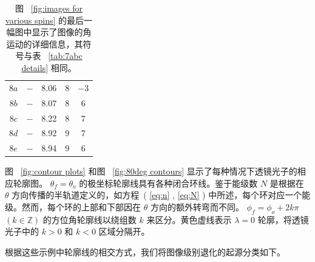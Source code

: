 \documentclass[aps,reprint,superscriptaddress,nofootinbib,floatfix,longbibliography,preprintnumbers]{revtex4-1}
\begin{document}
\begin{table}[!htbp]
\begin{tabular}{ccccc}
        $8a$         &         $-$         & 8.06 & 8 &         $-3$          \\ 
        $8b$         &         $-$         & 8.07 & 8 &         $6$          \\ 
        $8c$         &         $-$         & 8.22 & 8 &         $7$          \\ 
        $8d$         &         $-$         & 8.92 & 9 &         $7$          \\ 
        $8e$         &         $-$         & 8.94 & 9 &         $6$          \\  \hline
\end{tabular}
\caption{图~    \ref{fig:images for various spins}    的最后一幅图中显示了图像的角运动的详细信息，其符号与表~    \ref{tab:7abc details}    相同。  }
\label{tab:80deg details}
\end{table}     

图~    \ref{fig:contour plots}    和图~    \ref{fig:80deg contours}    显示了每种情况下透镜光子的相应轮廓图。   $\theta_f = \theta_o$    的极坐标轮廓线具有各种闭合环线。鉴于能级数    $N$    是根据在    $\theta$    方向传播的半轨道定义的，如方程~(    \ref{eq:n}    ,    \ref{eq:N}    ) 中所述，每个环对应一个能级。然而，每个环的上部和下部因在    $\theta$    方向的额外转弯而不同。   $\phi_f = \phi_o + 2k\pi$       $(k \in \mathbb{Z})$    的方位角轮廓线以绕组数    $k$    来区分。黄色虚线表示    $\lambda = 0$    轮廓，将透镜光子中的    $k > 0$    和    $k < 0$    区域分隔开。  

根据这些示例中轮廓线的相交方式，我们将图像级别退化的起源分类如下。  
\end{document}

